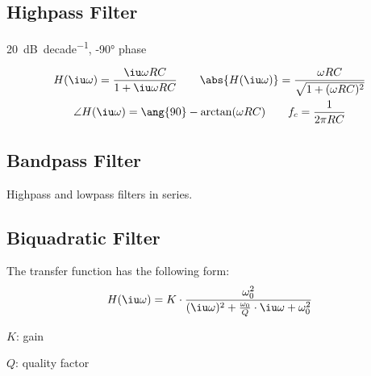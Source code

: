 	\subsection{Highpass Filter} %
		\SI{+20}{\deci\bel\per{decade}}, \ang{-90} phase
		
		\begin{gather*}
			H(\iu \omega) = \frac{\iu \omega R C}{1 + \iu \omega R C} \qquad \abs{H(\iu \omega)} = \frac{\omega R C}{\sqrt{1+(\omega RC)^2}} \\
			\angle H(\iu \omega) = \ang{90} - \arctan(\omega RC) \qquad f_c = \frac{1}{2\pi R C}
		\end{gather*}

		\begin{center}
		\end{center}
	
	\subsection{Bandpass Filter} %
		Highpass and lowpass filters in series.
	
	\subsection{Biquadratic Filter} %
		The transfer function has the following form:
		\[
			H(\iu \omega) = K \cdot \frac{\omega_0^2}{(\iu \omega)^2 + \frac{\omega_0}{Q} \cdot \iu \omega + \omega_0^2}
		\]
		\begin{tightitemize}
			\item[$K$:] gain
			\item[$Q$:] quality factor
		\end{tightitemize}
